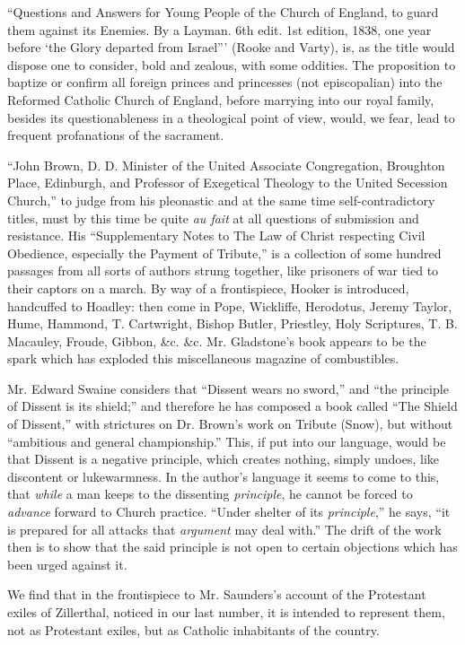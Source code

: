 ``Questions and Answers for Young People of the
Church of England, to guard them against its Enemies. By a Layman. 6th
edit. 1st edition, 1838, one year before ‘the Glory departed from
Israel''' (Rooke and Varty), is, as the title would dispose one to
consider, bold and zealous, with some oddities. The proposition to
baptize or confirm all foreign princes and princesses (not episcopalian)
into the Reformed Catholic Church of England, before marrying into our
royal family, besides its questionableness in a theological point of
view, would, we fear, lead to frequent profanations of the sacrament.

``John Brown, D. D. Minister of the United
Associate Congregation, Broughton Place, Edinburgh, and Professor of
Exegetical Theology to the United Secession Church,'' to judge from his
pleonastic and at the same time self-contradictory titles, must by this
time be quite \emph{au fait} at all questions of submission and
resistance. His ``Supplementary Notes to The Law of Christ respecting
Civil Obedience, especially the Payment of Tribute,'' is a collection
of some hundred passages from all sorts of authors strung together, like
prisoners of war tied to their captors on a march. By way of a
frontispiece, Hooker is introduced, handcuffed to Hoadley: then come in
Pope, Wickliffe, Herodotus, Jeremy Taylor, Hume, Hammond, T. Cartwright,
Bishop Butler, Priestley, Holy Scriptures, T. B. Macauley, Froude,
Gibbon, \&c. \&c. Mr. Gladstone's book appears to be the spark
which has exploded this miscellaneous magazine of combustibles.

Mr. Edward Swaine considers that ``Dissent wears
no sword,'' and ``the principle of Dissent is its shield;'' and
therefore he has composed a book called ``The Shield of Dissent,''
with strictures on Dr. Brown's work on Tribute (Snow), but without ``ambitious and general championship.'' This, if put into our
language, would be that Dissent is a negative principle, which creates
nothing, simply undoes, like discontent or lukewarmness. In the
author's language it seems to come to this, that \emph{while} a man
keeps to the dissenting \emph{principle}, he cannot be forced to \emph{advance}
forward to Church practice. ``Under shelter of its \emph{principle},''
he says, ``it is prepared for all attacks that \emph{argument} may deal
with.'' The drift of the work then is to show that the said principle
is not open to certain objections which has been urged against it.

We find that in the frontispiece to Mr.
Saunders's account of the Protestant exiles of Zillerthal, noticed in
our last number, it is intended to represent them, not as Protestant
exiles, but as Catholic inhabitants of the country.

